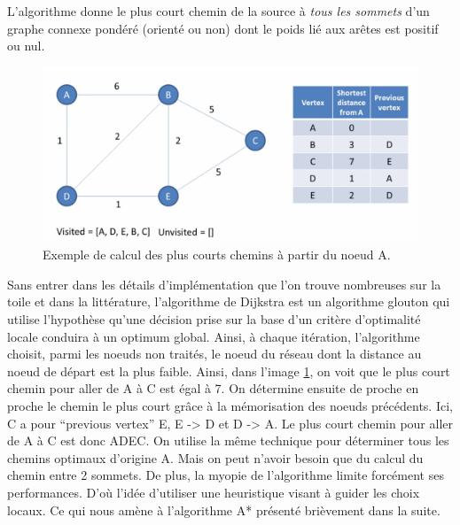 L'algorithme donne le plus court chemin de la source à \textit{tous les sommets} d'un graphe 
connexe pondéré (orienté ou non) dont le poids lié aux arêtes est positif ou nul.



 


\begin{figure}[htp]
  \centering
  \includegraphics[width=15cm]{images/algo_dij}
  \caption{Exemple de calcul des plus courts chemins à partir du noeud A.}
  \label{fig:graph_dij}
\end{figure}

Sans entrer dans les détails d'implémentation que l'on trouve nombreuses sur la toile et dans la littérature, l'algorithme de Dijkstra est 
un algorithme glouton qui utilise l'hypothèse qu'une décision prise sur la base
d'un critère d'optimalité locale conduira à un optimum global. Ainsi, à chaque itération, l'algorithme choisit, parmi les noeuds non traités, le noeud
du réseau dont la distance au noeud de départ est la plus faible. Ainsi, dans l'image \ref{fig:graph_dij}, on voit que le plus court chemin pour aller de A à C
est égal à 7. On détermine ensuite de proche en proche le chemin le plus court grâce à la mémorisation des noeuds précédents. Ici, C a pour ``previous vertex'' E, 
E -> D et D -> A. Le plus court chemin pour aller de A à C est donc ADEC. On utilise la même technique pour déterminer tous les chemins optimaux 
d'origine A. Mais on peut n'avoir besoin que du calcul du chemin entre 2 sommets. De plus, la myopie de l'algorithme limite forcément ses performances. D'où l'idée
d'utiliser une heuristique visant à guider les choix locaux. Ce qui nous amène à l'algorithme A* présenté brièvement dans la suite.

%   
